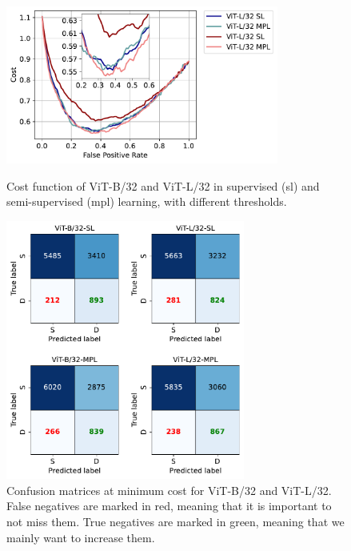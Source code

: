 \begin{figure}[p]
    \centering
    \includegraphics[width=0.8\textwidth]{images/bdd100k/training/cost.pdf}
    \caption[Cost function of ViT-B/32 and ViT-L/32]
    {Cost function of ViT-B/32 and ViT-L/32 in supervised (\acs{sl}) and semi-supervised 
    (\acs{mpl}) learning, with different thresholds.}
    \label{fig:cost_roc}
    \vspace{1cm}
    \includegraphics[width=0.7\textwidth]{images/bdd100k/training/confusion-matrix_min_cost.pdf}
    \caption[Confusion matrices at minimum cost]
    {Confusion matrices at minimum cost for ViT-B/32 and ViT-L/32.
    False negatives are marked in red, meaning that it is important to not miss 
    them. True negatives are marked in green, meaning that we mainly want to 
    increase them.}
    \label{fig:confusion_matrix_min_cost}
\end{figure}

